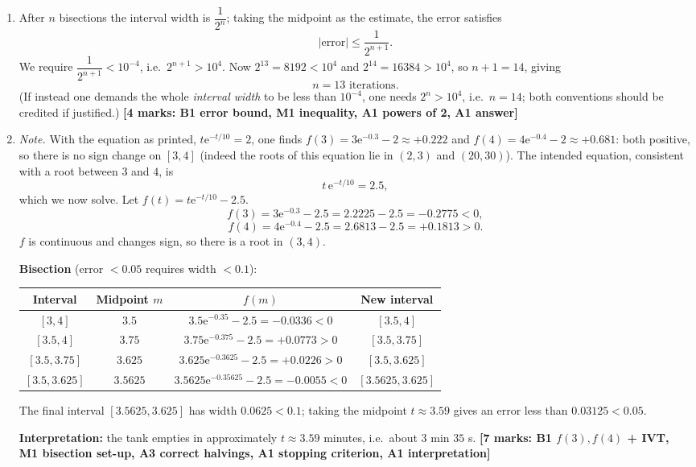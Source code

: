 \documentclass[11pt]{article}
\begin{document}
\begin{corrige}
\begin{enumerate}
\item After $n$ bisections the interval width is $\dfrac{1}{2^{n}}$; taking the midpoint as the estimate, the error satisfies
\[
|\text{error}|\le \frac{1}{2^{n+1}}.
\]
We require $\dfrac{1}{2^{n+1}}<10^{-4}$, i.e.\ $2^{n+1}>10^{4}$. Now $2^{13}=8192<10^{4}$ and $2^{14}=16384>10^{4}$, so $n+1=14$, giving
\[
\boxed{n=13\text{ iterations}.}
\]
(If instead one demands the whole \emph{interval width} to be less than $10^{-4}$, one needs $2^{n}>10^{4}$, i.e.\ $n=14$; both conventions should be credited if justified.) \hfill \textbf{[4 marks: B1 error bound, M1 inequality, A1 powers of 2, A1 answer]}
\item \emph{Note.} With the equation as printed, $t\mathrm{e}^{-t/10}=2$, one finds $f(3)=3\mathrm{e}^{-0.3}-2\approx+0.222$ and $f(4)=4\mathrm{e}^{-0.4}-2\approx+0.681$: both positive, so there is no sign change on $[3,4]$ (indeed the roots of this equation lie in $(2,3)$ and $(20,30)$). The intended equation, consistent with a root between $3$ and $4$, is
\[
t\,\mathrm{e}^{-t/10}=2.5,
\]
which we now solve. Let $f(t)=t\mathrm{e}^{-t/10}-2.5$.
\[
f(3)=3\mathrm{e}^{-0.3}-2.5=2.2225-2.5=-0.2775<0,
\]
\[
f(4)=4\mathrm{e}^{-0.4}-2.5=2.6813-2.5=+0.1813>0.
\]
$f$ is continuous and changes sign, so there is a root in $(3,4)$.

\textbf{Bisection} (error $<0.05$ requires width $<0.1$):
\begin{center}
\begin{tabular}{|c|c|c|c|}
\hline
\rowcolor{popblueL} Interval & Midpoint $m$ & $f(m)$ & New interval \\
\hline
$[3,4]$ & $3.5$ & $3.5\mathrm{e}^{-0.35}-2.5=-0.0336<0$ & $[3.5,4]$ \\
\hline
$[3.5,4]$ & $3.75$ & $3.75\mathrm{e}^{-0.375}-2.5=+0.0773>0$ & $[3.5,3.75]$ \\
\hline
$[3.5,3.75]$ & $3.625$ & $3.625\mathrm{e}^{-0.3625}-2.5=+0.0226>0$ & $[3.5,3.625]$ \\
\hline
$[3.5,3.625]$ & $3.5625$ & $3.5625\mathrm{e}^{-0.35625}-2.5=-0.0055<0$ & $[3.5625,3.625]$ \\
\hline
\end{tabular}
\end{center}
The final interval $[3.5625,3.625]$ has width $0.0625<0.1$; taking the midpoint $t\approx3.59$ gives an error less than $0.03125<0.05$.

\textbf{Interpretation:} the tank empties in approximately $t\approx3.59$ minutes, i.e.\ about $3$ min $35$ s. \hfill \textbf{[7 marks: B1 $f(3),f(4)$ + IVT, M1 bisection set-up, A3 correct halvings, A1 stopping criterion, A1 interpretation]}
\end{enumerate}
\end{corrige}
\end{document}
